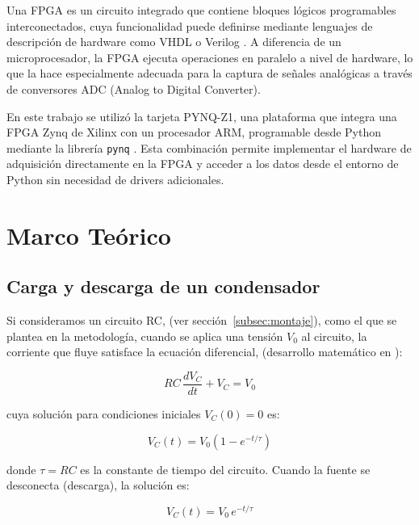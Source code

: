 \documentclass[conference]{IEEEtran}
\begin{document}
Una FPGA es un circuito integrado que contiene bloques lógicos programables interconectados, cuya funcionalidad puede definirse mediante lenguajes de descripción de hardware como VHDL o Verilog \cite{xilinx_ug}. A diferencia de un microprocesador, la FPGA ejecuta operaciones en paralelo a nivel de hardware, lo que la hace especialmente adecuada para la captura de señales analógicas a través de conversores ADC (Analog to Digital Converter).

En este trabajo se utilizó la tarjeta PYNQ-Z1, una plataforma que integra una FPGA Zynq de Xilinx con un procesador ARM, programable desde Python mediante la librería \texttt{pynq} \cite{pynq_docs}. Esta combinación permite implementar el hardware de adquisición directamente en la FPGA y acceder a los datos desde el entorno de Python sin necesidad de drivers adicionales.

\section{Marco Teórico}

\subsection{Carga y descarga de un condensador}

Si consideramos un circuito RC, (ver sección~\ref{subsec:montaje}), como el que se plantea en la metodología, cuando se aplica una tensión $V_0$ al circuito, la corriente que fluye satisface la ecuación diferencial, (desarrollo matemático en \cite[p.~273-274]{hayt2012}):

\begin{equation}
    RC\,\frac{dV_C}{dt} + V_C = V_0
    \label{eq:ode}
\end{equation}

cuya solución para condiciones iniciales $V_C(0) = 0$ es:

\begin{equation}
    V_C(t) = V_0\left(1 - e^{-t/\tau}\right)
    \label{eq:carga}
\end{equation}

donde $\tau = RC$ es la constante de tiempo del circuito. Cuando la fuente se desconecta (descarga), la solución es:

\begin{equation}
    V_C(t) = V_0\, e^{-t/\tau}
    \label{eq:descarga}
\end{equation}
\end{document}
